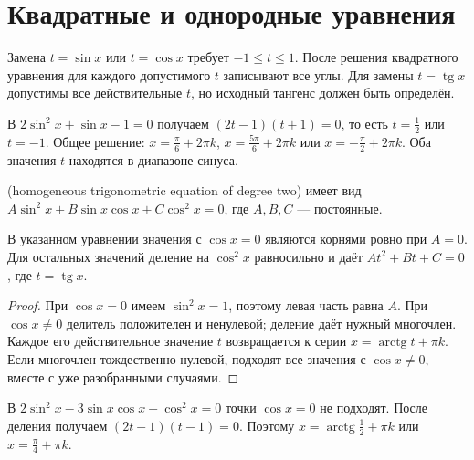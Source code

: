 \section{Квадратные и однородные уравнения}
Замена \(t=\sin x\) или \(t=\cos x\) требует \(-1\leq t\leq1\). После решения квадратного уравнения для каждого допустимого \(t\) записывают все углы. Для замены \(t=\operatorname{tg}x\) допустимы все действительные \(t\), но исходный тангенс должен быть определён.
\begin{example}В \(2\sin^2x+\sin x-1=0\) получаем \((2t-1)(t+1)=0\), то есть \(t=\frac12\) или \(t=-1\). Общее решение: \(x=\frac\pi6+2\pi k\), \(x=\frac{5\pi}6+2\pi k\) или \(x=-\frac\pi2+2\pi k\). Оба значения \(t\) находятся в диапазоне синуса.\end{example}
\begin{definition} (homogeneous trigonometric equation of degree two) имеет вид \(A\sin^2x+B\sin x\cos x+C\cos^2x=0\), где \(A,B,C\) — постоянные.\end{definition}
\begin{theorem}
В указанном уравнении значения с \(\cos x=0\) являются корнями ровно при \(A=0\). Для остальных значений деление на \(\cos^2x\) равносильно и даёт \(At^2+Bt+C=0\), где \(t=\operatorname{tg}x\).
\end{theorem}
\begin{proof}При \(\cos x=0\) имеем \(\sin^2x=1\), поэтому левая часть равна \(A\). При \(\cos x\ne0\) делитель положителен и ненулевой; деление даёт нужный многочлен. Каждое его действительное значение \(t\) возвращается к серии \(x=\operatorname{arctg}t+\pi k\). Если многочлен тождественно нулевой, подходят все значения с \(\cos x\ne0\), вместе с уже разобранными случаями.\end{proof}
\begin{example}В \(2\sin^2x-3\sin x\cos x+\cos^2x=0\) точки \(\cos x=0\) не подходят. После деления получаем \((2t-1)(t-1)=0\). Поэтому \(x=\operatorname{arctg}\frac12+\pi k\) или \(x=\frac\pi4+\pi k\).\end{example}
